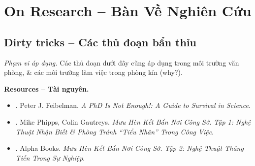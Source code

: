 \documentclass[12pt]{article}
\begin{document}

\section{On Research -- Bàn Về Nghiên Cứu}
\label{sect: research}

\subsection{Dirty tricks -- Các thủ đoạn bẩn thỉu}
{\it Phạm vi áp dụng.} Các thủ đoạn dưới đây cũng áp dụng trong môi trường văn phòng, \& các môi trường làm việc trong phòng kín (why?).

\noindent\textbf{\textsf{Resources -- Tài nguyên.}}
\begin{itemize}
	\item \cite{Feibelman2011}. {\sc Peter J. Feibelman}. {\it A PhD Is Not Enough!: A Guide to Survival in Science}.
	\item \cite{Phipps_Gautreys_muu_hen_ke_ban_tap_1}. {\sc Mike Phipps, Colin Gautreys}. {\it Mưu Hèn Kết Bẩn Nơi Công Sở. Tập 1: Nghệ Thuật Nhận Biết \& Phòng Tránh ``Tiểu Nhân'' Trong Công Việc}.
	\item \cite{muu_hen_ke_ban_tap_2}. Alpha Books. {\it Mưu Hèn Kết Bẩn Nơi Công Sở. Tập 2: Nghệ Thuật Thăng Tiến Trong Sự Nghiệp}.
\end{itemize}
\end{document}
